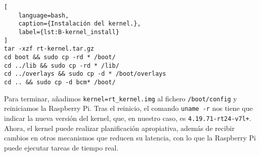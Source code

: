 \begin{lstlisting}[
    language=bash,
    caption={Instalación del kernel.},
    label={lst:B-kernel_install}
]
tar -xzf rt-kernel.tar.gz
cd boot && sudo cp -rd * /boot/
cd ../lib && sudo cp -rd * /lib/
cd ../overlays && sudo cp -d * /boot/overlays
cd .. && sudo cp -d bcm* /boot/
\end{lstlisting}

Para terminar, añadimos \lstinline{kernel=rt_kernel.img} al fichero
\texttt{/boot/config} y reiniciamos la Raspberry Pi. Tras el reinicio, el
comando \lstinline{uname -r} nos tiene que indicar la nueva versión del kernel,
que, en nuestro caso, es \texttt{4.19.71-rt24-v7l+}. Ahora, el kernel puede
realizar planificación apropiativa, además de recibir cambios en otros
mecanismos que reducen su latencia, con lo que la Raspberry Pi puede ejecutar
tareas de tiempo real.
